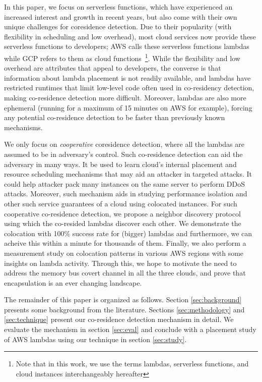 In this paper, we focus on serverless functions, which have experienced an
increased interest and growth in recent years, but also come with their own
unique challenges for coresidence detection. Due to their popularity 
(with flexibility in scheduling and low overhead), 
most cloud services now provide these serverless functions to
developers; AWS calls these serverless functions lambdas~\cite{awslambda} while
GCP refers to them as cloud functions~\cite{gcpfunctions}\footnote{Note that in
this work, we use the terms lambdas, serverless functions, and cloud instances
interchangeably hereafter}.  While the flexibility and low overhead are
attributes that appeal to developers, the converse is that information about
lambda placement is not readily available, and lambdas have restricted runtimes
that limit low-level code often used in co-residency detection, making
co-residence detection more difficult. Moreover, lambdas are also more ephemeral
(running for a maximum of 15 minutes on AWS for example), 
forcing any potential co-residence
detection to be faster than previously known mechanisms. 


We only focus on \emph{cooperative} coresidence detection, where all the 
lambdas are assumed to be in adversary's control. Such co-residence 
detection can aid the adversary in many ways. It be used to learn cloud's 
internal placement and resource scheduling mechanisms that may aid an attacker 
in targeted attacks\cite{ristenpartccs2009,varadarajan2015}. It could help 
attacker pack many instances on the same server to perform DDoS attacks. 
Moreover, such mechanism aids in studying performance isolation and other 
such service guarantees of a cloud using colocated instances\cite{wangusenix2018}.
For such cooperative co-residence detection, we propose a neighbor discovery 
protocol using which the co-resided lambdas discover each other. 
We demonstrate the colocation with 100\% success rate for (bigger) lambdas 
and furthermore, we can acheive this within a minute for thousands of them.
Finally, we also perform a measurement study on colocation patterns in
various AWS regions with some insights on lambda activity.  Through this, we hope to motivate the need to address the
memory bus covert channel in all the three clouds, and prove that encapsulation
is an ever changing landscape.


The remainder of this paper is organized as follows. Section
\ref{sec:background} presents some background from the literature. Sections
\ref{sec:methodology} and \ref{sec:technique} present our co-residence detection
mechanism in detail. We evaluate the mechanism in section \ref{sec:eval} and
conclude with a placement study of AWS lambdas using our technique in section
\ref{sec:study}.  
